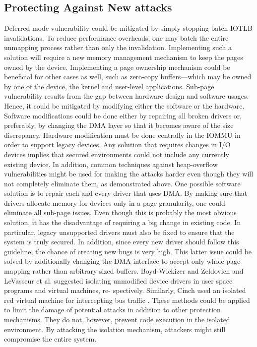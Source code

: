 \subsection{Protecting Against New attacks}
Deferred mode vulnerability could be mitigated by simply stopping batch IOTLB invalidations. To reduce performance overheads, one may batch the entire unmapping process rather than only the invalidation. Implementing such a solution will require a new memory management mechanism to keep the pages owned by the device. Implementing a page ownership mechanism could be beneficial for other cases as well, such as zero-copy buffers—which may be owned by one of the device, the kernel and user-level applications.
Sub-page vulnerability results from the gap between hardware design and software usages. Hence, it could be mitigated by modifying either the software or the hardware. Software modifications could be done either by repairing all broken drivers or, preferably, by changing the DMA layer so that it becomes aware of the size discrepancy. Hardware modification must be done centrally in the IOMMU in order to support legacy devices. Any solution that requires changes in I/O devices implies that secured environments could not include any currently existing device. In addition, common techniques against heap-overflow vulnerabilities might be used for making the attacks harder even though they will not completely eliminate them, as demonstrated above.
One possible software solution is to repair each and every driver that uses DMA. By making sure that drivers allocate memory for devices only in a page granularity, one could eliminate all sub-page issues. Even though this is probably the most obvious solution, it has the disadvantage of requiring a big change in existing code. In particular, legacy unsupported drivers must also be fixed to ensure that the system is truly secured. In addition, since every new driver should follow this guideline, the chance of creating new bugs is very high. This latter issue could be solved by additionally changing the DMA interface to accept only whole page mapping rather than arbitrary sized buffers.
Boyd-Wickizer and Zeldovich \cite{BWZ10} and LeVasseur et al. \cite{LUSG04} suggested isolating unmodified device drivers in user space programs and virtual machines, re- spectively. Similarly, Cinch used an isolated red virtual machine for intercepting bus traffic \cite{AWH16}. These methods could be applied to limit the damage of potential attacks in addition to other protection mechanisms. They do not, however, prevent code execution in the isolated environment. By attacking the isolation mechanism, attackers might still compromise the entire system.

